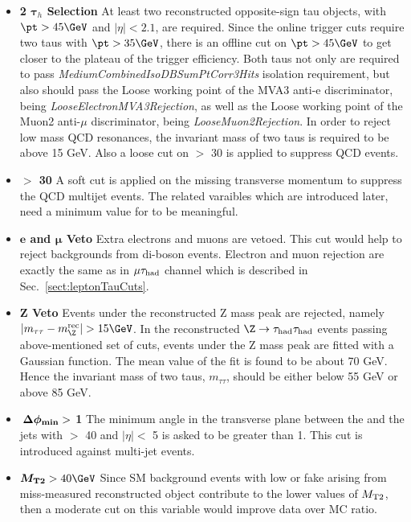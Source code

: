 \begin{itemize}
\item \textbf{2 $\boldsymbol\tau_h$ Selection} At least two reconstructed opposite-sign tau objects, 
with $\pt>45\GeV$ and $|\eta|<2.1$, are required. Since the online trigger cuts require two taus with 
$\pt>35\GeV$, there is an offline cut on $\pt>45\GeV$ to get closer to the plateau of the trigger efficiency. 
Both taus not only are required to pass \emph{MediumCombinedIsoDBSumPtCorr3Hits} isolation requirement, 
but also should pass the Loose working point of the MVA3 anti-e discriminator, being \emph{LooseElectronMVA3Rejection}, 
as well as the Loose working point of the Muon2 anti-$\mu$ discriminator, being \emph{LooseMuon2Rejection}. 
In order to reject low mass QCD resonances, the invariant mass of two taus is required to be above 15 GeV. Also a loose cut on \MET $>$ 30 \GeV is applied to suppress QCD events.
\item \textbf{\MET $>$ 30 \GeV} A soft cut is applied on the missing transverse momentum to suppress the QCD multijet events. 
The \MET related varaibles which are introduced later, need a minimum value for \MET to be meaningful. 
\item \textbf{$\boldsymbol e$ and $\boldsymbol\mu$ Veto} Extra electrons and muons are vetoed. This 
cut would help to reject backgrounds from di-boson events. Electron and muon rejection 
are exactly the same as in $\mu\tau_{\rm had}$ channel which is described in Sec.~\ref{sect:leptonTauCuts}.
\item \textbf{Z Veto} Events under the reconstructed Z mass peak are rejected, namely $|m_{\tau\tau}-m_{\Z}^{\rm rec}|>15\GeV$. 
In the reconstructed $\Z\rightarrow \Tau\Tau$ events passing above-mentioned set of cuts, events under the Z mass peak are fitted 
with a Gaussian function. The mean value of the fit is found to be about 70 GeV. Hence the invariant mass of two taus, $m_{\tau\tau}$, should be 
either below 55 GeV or above 85 GeV.  
\item \textbf{$\boldsymbol{\,{\Delta\phi_{\rm min}}} > $ 1} The minimum angle in the transverse plane between the \MET and the jets with \PT $>$ 40 \GeV and $|\eta| <$ 5 is asked to be greater than 1. This cut is introduced against multi-jet events.
\item \textbf{$\boldsymbol\mttwo>40\GeV$} Since SM background events with low \MET or fake \MET arising from miss-measured reconstructed object
 contribute to the lower values of ${M_{\rm T2}}$, then a moderate cut on this variable would improve data over MC ratio.  
\end{itemize}
